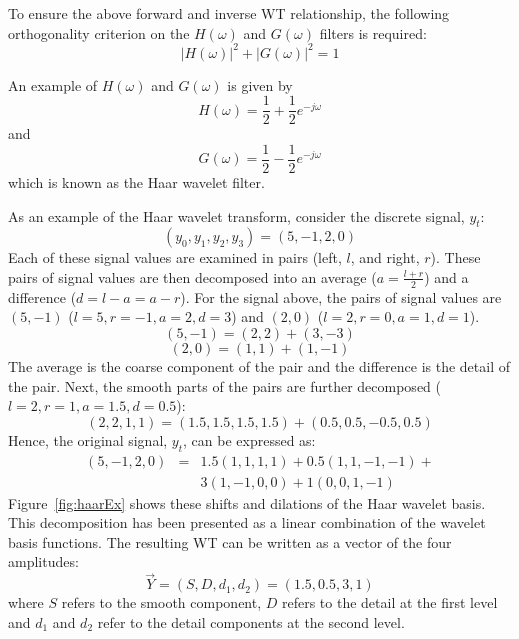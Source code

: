 \documentclass[12pt]{report}
\begin{document}
To ensure the above forward and inverse WT relationship, the following orthogonality
criterion on the $H(\omega)$ and $G(\omega)$ filters is required:
\begin{equation}
|H(\omega)|^{2} + |G(\omega)|^{2} = 1
\end{equation}

An example of $H(\omega)$ and $G(\omega)$ is given by
\begin{equation}
	H(\omega)=\frac{1}{2}+\frac{1}{2} e^{-j\omega}
\end{equation}
and
\begin{equation}
        G(\omega)=\frac{1}{2}-\frac{1}{2} e^{-j\omega}
\end{equation}
which is known as the Haar wavelet filter.

As an example \cite{haarExWeb} of the Haar wavelet transform, consider the discrete signal, $y_{t}$:
\begin{equation}
	(y_{0},y_{1},y_{2},y_{3}) = (5,-1,2,0)
\end{equation}
Each of these signal values are examined in pairs (left, $l$, and right, $r$). These pairs of
signal values are then decomposed into an average ($a=\frac{l+r}{2}$) and a difference ($d=l-a=a-r$).
For the signal above, the pairs of signal values are $(5,-1)$ ($l=5, r=-1, a=2, d=3$) and $(2,0)$
($l=2, r=0, a=1, d=1$).
\begin{equation}
	(5,-1)=(2,2)+(3,-3)
\end{equation}
\begin{equation}
	(2,0)=(1,1)+(1,-1)
\end{equation}
The average is the coarse component of the pair and the difference is the detail of the pair.
Next, the smooth parts of the pairs are further decomposed ($l=2, r=1, a=1.5, d=0.5$):
\begin{equation}
	(2,2,1,1)=(1.5,1.5,1.5,1.5)+(0.5,0.5,-0.5,0.5)
\end{equation}
Hence, the original signal, $y_{t}$, can be expressed as:
\begin{eqnarray}
	(5,-1,2,0) & = & 1.5(1,1,1,1)+0.5(1,1,-1,-1)+ \nonumber \\
		   &   & 3(1,-1,0,0)+1(0,0,1,-1)
\end{eqnarray}
Figure~\ref{fig:haarEx} shows these shifts and dilations of the Haar wavelet basis.
This decomposition has been presented as a linear combination of the wavelet basis functions. The resulting
WT can be written as a vector of the four amplitudes:
\begin{equation}
	\vec{Y}=(S,D,d_{1},d_{2})=(1.5,0.5,3,1)
\end{equation}
where $S$ refers to the smooth component, $D$ refers to the detail at the first level and $d_{1}$ and
$d_{2}$ refer to the detail components at the second level.
\end{document}
